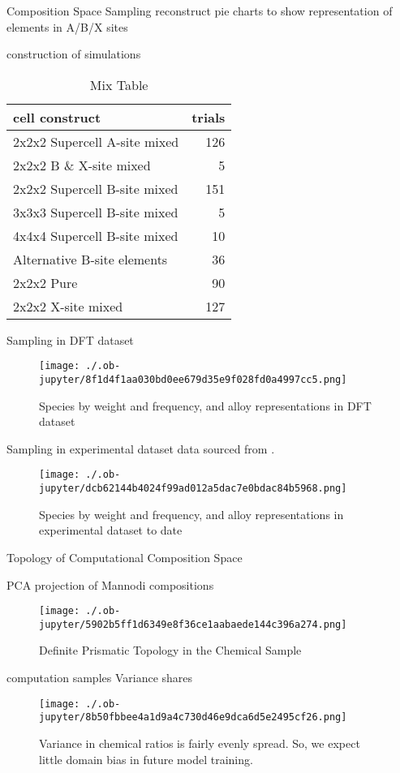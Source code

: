 \documentclass[8pt, compress]{beamer}
\begin{document}
\begin{frame}[allowframebreaks]{Composition Space Sampling}
reconstruct pie charts to show representation of elements in A/B/X sites
\begin{block}{construction of simulations}
\begin{table}[htbp]
\caption{\label{tbl:mixing} Mix Table}
\centering
\begin{tabular}{lr}
cell construct & trials\\
\hline
2x2x2 Supercell A-site mixed & 126\\
2x2x2 B \& X-site mixed & 5\\
2x2x2 Supercell B-site mixed & 151\\
3x3x3 Supercell B-site mixed & 5\\
4x4x4 Supercell B-site mixed & 10\\
Alternative B-site elements & 36\\
2x2x2 Pure & 90\\
2x2x2 X-site mixed & 127\\
\end{tabular}
\end{table}
\end{block}
\begin{block}{Sampling in DFT dataset}
\begin{figure}[htbp]
\centering
\texttt{[image: ./.ob-jupyter/8f1d4f1aa030bd0ee679d35e9f028fd0a4997cc5.png]}
\caption{\label{fig:dft_rep} Species by weight and frequency, and alloy representations in DFT dataset}
\end{figure}
\end{block}
\begin{block}{Sampling in experimental dataset}
data sourced from \cite{almora-2020-devic-perfor}.
\begin{figure}[htbp]
\centering
\texttt{[image: ./.ob-jupyter/dcb62144b4024f99ad012a5dac7e0bdac84b5968.png]}
\caption{\label{fig:exp_rep} Species by weight and frequency, and alloy representations in experimental dataset to date}
\end{figure}
\end{block}
\end{frame}
\begin{frame}[allowframebreaks]{Topology of Computational Composition Space}
\begin{block}{PCA projection of Mannodi compositions}
\begin{figure}[htbp]
\centering
\texttt{[image: ./.ob-jupyter/5902b5ff1d6349e8f36ce1aabaede144c396a274.png]}
\caption{Definite Prismatic Topology in the Chemical Sample}
\end{figure}
\end{block}
\begin{block}{computation samples Variance shares}
\begin{figure}[htbp]
\centering
\texttt{[image: ./.ob-jupyter/8b50fbbee4a1d9a4c730d46e9dca6d5e2495cf26.png]}
\caption{Variance in chemical ratios is fairly evenly spread. So, we expect little domain bias in future model training.}
\end{figure}
\end{block}
\end{frame}
\end{document}
